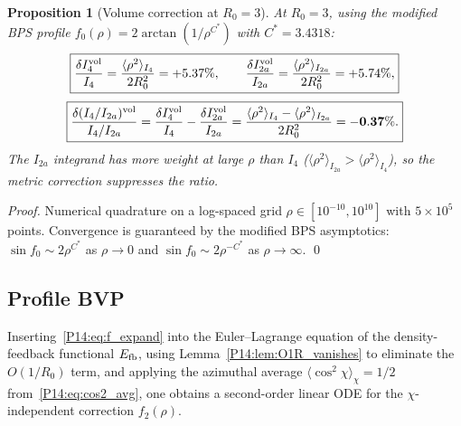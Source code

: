 \documentclass[11pt,a4paper]{article}
\newtheorem{proposition}[theorem]{Proposition}
\theoremstyle{definition}
\theoremstyle{remark}
\newcommand{\Cstar}{C^*}
\newcommand{\fzero}{f_0}
\newcommand{\ftwo}{f_2}
\newcommand{\Rzero}{R_0}
\begin{document}
\begin{proposition}[Volume correction at $\Rzero = 3$]
\label{P14:prop:volume_correction}
At $\Rzero=3$, using the modified BPS profile
$\fzero(\rho)=2\arctan(1/\rho^{\Cstar})$ with $\Cstar=3.4318$:
\begin{equation}
  \boxed{\frac{\delta I_4^{\rm vol}}{I_4}
  = \frac{\langle\rho^2\rangle_{I_4}}{2\Rzero^2}
  = +5.37\%,
  \qquad
  \frac{\delta I_{2a}^{\rm vol}}{I_{2a}}
  = \frac{\langle\rho^2\rangle_{I_{2a}}}{2\Rzero^2}
  = +5.74\%,}
  \label{P14:eq:vol_each}
\end{equation}
\begin{equation}
  \boxed{\frac{\delta(I_4/I_{2a})^{\rm vol}}{I_4/I_{2a}}
  = \frac{\delta I_4^{\rm vol}}{I_4} - \frac{\delta I_{2a}^{\rm vol}}{I_{2a}}
  = \frac{\langle\rho^2\rangle_{I_4} - \langle\rho^2\rangle_{I_{2a}}}{2\Rzero^2}
  = \mathbf{-0.37\%}.}
  \label{P14:eq:vol_ratio}
\end{equation}
The $I_{2a}$ integrand has more weight at large $\rho$ than $I_4$
($\langle\rho^2\rangle_{I_{2a}} > \langle\rho^2\rangle_{I_4}$),
so the metric correction suppresses the ratio.
\end{proposition}

\begin{proof}
Numerical quadrature on a log-spaced grid $\rho\in[10^{-10},10^{10}]$
with $5\times10^5$ points. Convergence is guaranteed by the modified BPS
asymptotics: $\sin\fzero\sim2\rho^{\Cstar}$ as $\rho\to0$
and $\sin\fzero\sim2\rho^{-\Cstar}$ as $\rho\to\infty$.
\qed
\end{proof}

\subsection{Profile BVP}
\label{P14:sec:profile_bvp}

Inserting~\eqref{P14:eq:f_expand} into the Euler--Lagrange equation of the
density-feedback functional $E_{\rm fb}$, using Lemma~\ref{P14:lem:O1R_vanishes}
to eliminate the $O(1/\Rzero)$ term, and applying the azimuthal average
$\langle\cos^2\chi\rangle_\chi=1/2$ from~\eqref{P14:eq:cos2_avg},
one obtains a second-order linear ODE for the $\chi$-independent
correction $\ftwo(\rho)$.
\end{document}
